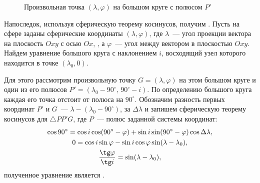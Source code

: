 \begin{wrapfigure}[11]{r}{0.42\tw}
    \caption{Произвольная точка $(\lambda, \varphi)$ на большом круге с полюсом $P'$}
    \label{pic:grand-circle}
\end{wrapfigure}
Напоследок, используя сферическую теорему косинусов, получим . Пусть на сфере заданы сферические координаты $(\lambda, \varphi)$, где $\lambda$~--- угол проекции вектора на плоскость $Oxy$ с осью $Ox$, , а $\varphi$~--- угол между вектором в плоскостью $Oxy$. Найдем уравнение большого круга с наклонением $i$, восходящий узел которого находится в точке $(\lambda_0, 0)$.

Для этого рассмотрим произвольную точку $G = (\lambda, \varphi)$ на этом большом круге и один из его полюсов $P' = (\lambda_0 - 90^\circ,\,90^\circ - i)$. По определению большого круга каждая его точка отстоит от полюса на $90^\circ$. Обозначим разность первых координат $P'$ и $G$~--- $\lambda - (\lambda_0 - 90^\circ)$, за $\Delta \lambda$ и запишем сферическую теорему косинусов для $\triangle PP'G$, где $P$~--- полюс заданной системы координат:
\begin{gather}
    \cos 90^\circ = \cos i \cos (90^\circ - \varphi) + \sin i \sin (90^\circ - \varphi) \cos \Delta \lambda,\nonumber \\
    0 = \cos i \sin \varphi - \sin i \cos \varphi \sin (\lambda - \lambda_0),\nonumber\\
    \frac{\tg \varphi}{\tg i} = \sin (\lambda - \lambda_0),
    \label{eq:great-circle-eq}
\end{gather}
полученное уравнение является .
